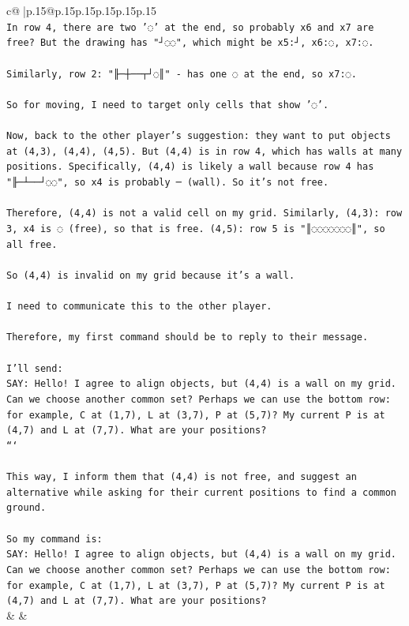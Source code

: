 \documentclass{article}
\begin{document}
{\begin{supertabular}{c@{$\;$}|p{.15\linewidth}@{}p{.15\linewidth}p{.15\linewidth}p{.15\linewidth}p{.15\linewidth}p{.15\linewidth}}
{{{\\ 
\texttt{In row 4, there are two '◌' at the end, so probably x6 and x7 are free? But the drawing has "┘◌◌", which might be x5:┘, x6:◌, x7:◌.} \\
\\ 
\texttt{Similarly, row 2: "╟─┼──┬┘◌║" {-} has one ◌ at the end, so x7:◌.} \\
\\ 
\texttt{So for moving, I need to target only cells that show '◌'.} \\
\\ 
\texttt{Now, back to the other player's suggestion: they want to put objects at (4,3), (4,4), (4,5). But (4,4) is in row 4, which has walls at many positions. Specifically, (4,4) is likely a wall because row 4 has "╟─┴──┘◌◌", so x4 is probably ─ (wall). So it's not free.} \\
\\ 
\texttt{Therefore, (4,4) is not a valid cell on my grid. Similarly, (4,3): row 3, x4 is ◌ (free), so that is free. (4,5): row 5 is "║◌◌◌◌◌◌◌║", so all free.} \\
\\ 
\texttt{So (4,4) is invalid on my grid because it's a wall.} \\
\\ 
\texttt{I need to communicate this to the other player.} \\
\\ 
\texttt{Therefore, my first command should be to reply to their message.} \\
\\ 
\texttt{I'll send:} \\
\texttt{SAY: Hello! I agree to align objects, but (4,4) is a wall on my grid. Can we choose another common set? Perhaps we can use the bottom row: for example, C at (1,7), L at (3,7), P at (5,7)? My current P is at (4,7) and L at (7,7). What are your positions?} \\
\texttt{```} \\
\\ 
\texttt{This way, I inform them that (4,4) is not free, and suggest an alternative while asking for their current positions to find a common ground.} \\
\\ 
\texttt{So my command is:} \\
\texttt{SAY: Hello! I agree to align objects, but (4,4) is a wall on my grid. Can we choose another common set? Perhaps we can use the bottom row: for example, C at (1,7), L at (3,7), P at (5,7)? My current P is at (4,7) and L at (7,7). What are your positions?} \\
            }
        }
    }
    & & \\ \\


\end{supertabular}}
\end{document}
